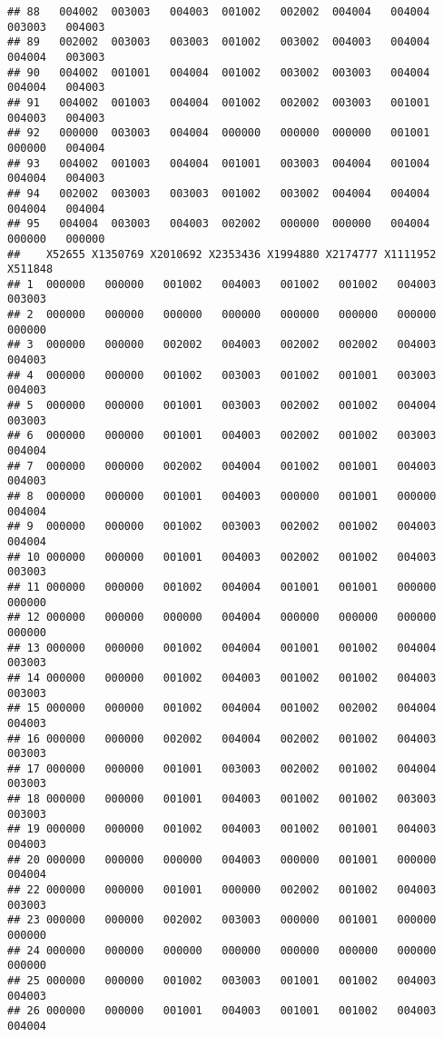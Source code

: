 \documentclass[
]{article}
\begin{document}
\begin{verbatim}
## 88   004002  003003   004003  001002   002002  004004   004004  003003   004003
## 89   002002  003003   003003  001002   003002  004003   004004  004004   003003
## 90   004002  001001   004004  001002   003002  003003   004004  004004   004003
## 91   004002  001003   004004  001002   002002  003003   001001  004003   004003
## 92   000000  003003   004004  000000   000000  000000   001001  000000   004004
## 93   004002  001003   004004  001001   003003  004004   001004  004004   004003
## 94   002002  003003   003003  001002   003002  004004   004004  004004   004004
## 95   004004  003003   004003  002002   000000  000000   004004  000000   000000
##    X52655 X1350769 X2010692 X2353436 X1994880 X2174777 X1111952 X511848
## 1  000000   000000   001002   004003   001002   001002   004003  003003
## 2  000000   000000   000000   000000   000000   000000   000000  000000
## 3  000000   000000   002002   004003   002002   002002   004003  004003
## 4  000000   000000   001002   003003   001002   001001   003003  004003
## 5  000000   000000   001001   003003   002002   001002   004004  003003
## 6  000000   000000   001001   004003   002002   001002   003003  004004
## 7  000000   000000   002002   004004   001002   001001   004003  004003
## 8  000000   000000   001001   004003   000000   001001   000000  004004
## 9  000000   000000   001002   003003   002002   001002   004003  004004
## 10 000000   000000   001001   004003   002002   001002   004003  003003
## 11 000000   000000   001002   004004   001001   001001   000000  000000
## 12 000000   000000   000000   004004   000000   000000   000000  000000
## 13 000000   000000   001002   004004   001001   001002   004004  003003
## 14 000000   000000   001002   004003   001002   001002   004003  003003
## 15 000000   000000   001002   004004   001002   002002   004004  004003
## 16 000000   000000   002002   004004   002002   001002   004003  003003
## 17 000000   000000   001001   003003   002002   001002   004004  003003
## 18 000000   000000   001001   004003   001002   001002   003003  003003
## 19 000000   000000   001002   004003   001002   001001   004003  004003
## 20 000000   000000   000000   004003   000000   001001   000000  004004
## 22 000000   000000   001001   000000   002002   001002   004003  003003
## 23 000000   000000   002002   003003   000000   001001   000000  000000
## 24 000000   000000   000000   000000   000000   000000   000000  000000
## 25 000000   000000   001002   003003   001001   001002   004003  004003
## 26 000000   000000   001001   004003   001001   001002   004003  004004

\end{verbatim}
\end{document}
